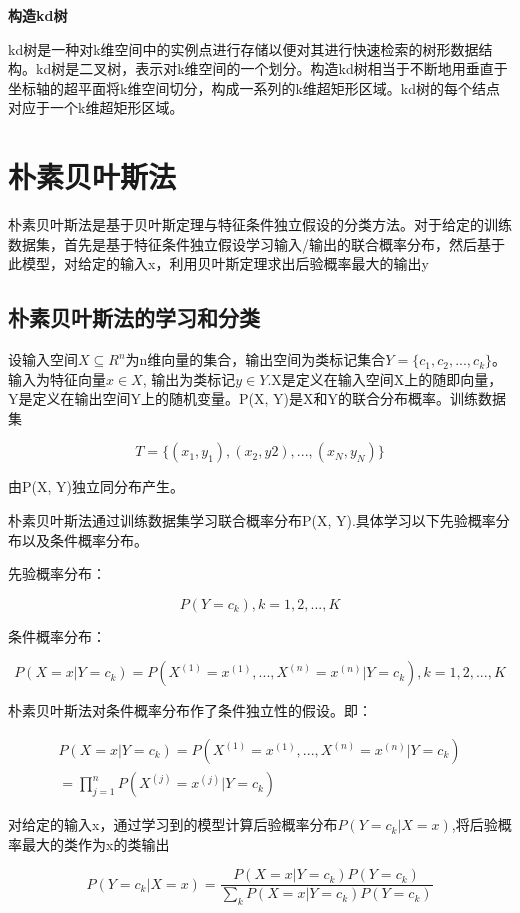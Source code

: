 \documentclass{ctexart}
\begin{document}
	\textbf{构造kd树}	
	
	kd树是一种对k维空间中的实例点进行存储以便对其进行快速检索的树形数据结构。kd树是二叉树，表示对k维空间的一个划分。构造kd树相当于不断地用垂直于坐标轴的超平面将k维空间切分，构成一系列的k维超矩形区域。kd树的每个结点对应于一个k维超矩形区域。
	
	\section{朴素贝叶斯法}
	
	朴素贝叶斯法是基于贝叶斯定理与特征条件独立假设的分类方法。对于给定的训练数据集，首先是基于特征条件独立假设学习输入/输出的联合概率分布，然后基于此模型，对给定的输入x，利用贝叶斯定理求出后验概率最大的输出y
	
	\subsection{朴素贝叶斯法的学习和分类}
	
	设输入空间\(X \subseteq R^n\)为n维向量的集合，输出空间为类标记集合\(Y = \{c_1, c_2,...,c_k\}\)。输入为特征向量\(x \in X\), 输出为类标记\(y \in Y\).X是定义在输入空间X上的随即向量，Y是定义在输出空间Y上的随机变量。P(X, Y)是X和Y的联合分布概率。训练数据集
	
	\[T = \{(x_1, y_1),(x_2, y2),...,(x_N, y_N)\}\]
	
	由P(X, Y)独立同分布产生。
	
	朴素贝叶斯法通过训练数据集学习联合概率分布P(X, Y).具体学习以下先验概率分布以及条件概率分布。
	
	先验概率分布：
	
	\[P(Y = c_k), k = 1, 2, ..., K\]
	
	条件概率分布：
	
	\[P(X = x|Y = c_k) = P(X^{(1)} = x^{(1)},...,X^{(n)} = x^{(n)}|Y = c_k), k = 1,2,...,K\]
	
	{\color{red}朴素贝叶斯法对条件概率分布作了条件独立性的假设}。即：
	
	\begin{align}
	P(X = x|Y = c_k) = P(X^{(1)} = x^{(1)},...,X^{(n)} = x^{(n)}|Y = c_k)\nonumber \\
						     = \prod_{j=1}^{n}P(X^{(j)} = x^{(j)} | Y = c_k)
	\end{align}
	
	对给定的输入x，通过学习到的模型计算后验概率分布\(P(Y=c_k|X = x)\),将后验概率最大的类作为x的类输出
	
	\[P(Y=c_k|X=x) = \frac{P(X=x|Y=c_k)P(Y=c_k)}{\sum_{k}P(X=x|Y=c_k)P(Y=c_k)}\]
\end{document}
